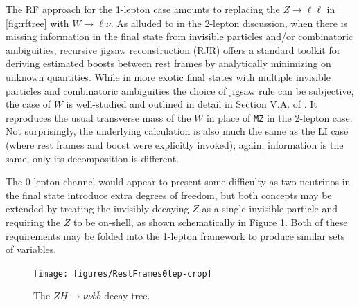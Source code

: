The RF approach for the 1-lepton case amounts to replacing the $Z\to\ell\ell$ in \ref{fig:rftree} with $W\to\ell\nu$.  As alluded to in the 2-lepton discussion, when there is missing information in the final state from invisible particles and/or combinatoric ambiguities, recursive jigsaw reconstruction (RJR) offers a standard toolkit for deriving estimated boosts between rest frames by analytically minimizing on unknown quantities.  While in more exotic final states with multiple invisible particles and combinatoric ambiguities the choice of jigsaw rule can be subjective, the case of $W$ is well-studied and outlined in detail in Section V.A. of \cite{rjr}.  It reproduces the usual transverse mass of the $W$ in place of \texttt{MZ} in the 2-lepton case.  Not surprisingly, the underlying calculation is also much the same as the LI case (where rest frames and boost were explicitly invoked); again, information is the same, only its decomposition is different.

The 0-lepton channel would appear to present some difficulty as two neutrinos in the final state introduce extra degrees of freedom, but both concepts may be extended by treating the invisibly decaying $Z$ as a single invisible particle and requiring the $Z$ to be on-shell, as shown schematically in Figure \ref{fig:rf0lep}.  Both of these requirements may be folded into the 1-lepton framework to produce similar sets of variables.  
\begin{figure}[!htbp]\captionsetup{justification=centering}
  \centering
  \texttt{[image: figures/RestFrames0lep-crop]}
  \caption{The $ZH\to\nu\nu b\bar{b}$ decay tree.}
  \label{fig:rf0lep}
\end{figure}

